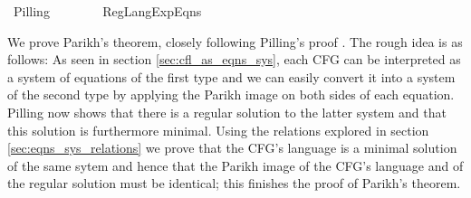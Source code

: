 %
\begin{isabellebody}%
%
%
\isadelimdocument
%
\endisadelimdocument
%
\isatagdocument
%
\isamarkuptrue%
%
\endisatagdocument
{\isafolddocument}%
%
\isadelimdocument
%
\endisadelimdocument
%
\isadelimtheory
%
\endisadelimtheory
%
\isatagtheory
{}\isamarkupfalse%
\ Pilling\isanewline
\ \ \ \isanewline
\ \ \ \ {\isachardoublequoteopen}Reg{\isacharunderscore}{\kern0pt}Lang{\isacharunderscore}{\kern0pt}Exp{\isacharunderscore}{\kern0pt}Eqns{\isachardoublequoteclose}\isanewline
{}%
\endisatagtheory
{\isafoldtheory}%
%
\isadelimtheory
%
\endisadelimtheory
%
\begin{isamarkuptext}%
We prove Parikh's theorem, closely following Pilling's proof \cite{Pilling}. The rough
idea is as follows: As seen in section \ref{sec:cfl_as_eqns_sys}, each CFG can be interpreted as a
system of  equations of the first type and we can easily convert it into a system
of the second type by applying the Parikh image on both sides of each equation. Pilling now shows
that there is a regular solution to the latter system and that this solution is furthermore minimal.
Using the relations explored in section \ref{sec:eqns_sys_relations} we prove that the CFG's
language is a minimal solution of the same sytem and hence that the Parikh image of the CFG's
language and of the regular solution must be identical; this finishes the proof of Parikh's theorem.


\end{isamarkuptext}
\end{isabellebody}
